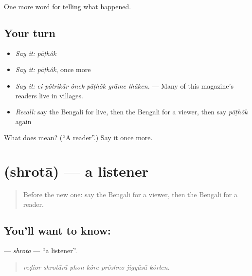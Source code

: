 \begin{grammarlens}[title={What you've built}]
One more word for telling what happened.
\end{grammarlens}

\subsection*{Your turn}
\begin{itemize}
\raggedright
  \item \emph{Say it:} \emph{pāṭhôk}
  \item \emph{Say it:} \emph{pāṭhôk}, once more
  \item \emph{Say it:} \emph{ei pôtrikār ônek pāṭhôk grāme thāken.} — Many of this magazine's readers live in villages.
  \item \emph{Recall:} say the Bengali for live, then the Bengali for a viewer, then say \emph{pāṭhôk} again
\end{itemize}

\begin{tcolorbox}[breakable,colback=teal!4,colframe=teal!35!black,title={Before you move on}]
What does  mean? (\textquotedblleft{}A reader\textquotedblright{}.) Say it once more.
\end{tcolorbox}
\section[\texorpdfstring{\bn{শ্রোতা} (shrotā)}{শ্রোতা (shrotā)}]{ (shrotā) — a listener}

\label{lesson:BN-C300-shrota}



\begin{quote}
Before the new one: say the Bengali for a viewer, then the Bengali for a reader.
\end{quote}

\subsection*{You'll want to know: }
\textbf{} — \emph{shrotā} — \textquotedblleft{}a listener\textquotedblright{}.

\begin{quote}
      
\end{quote}

\begin{quote}
\emph{reḍior shrotārā phon kôre prôshno jigyāsā kôrlen.}
\end{quote}

